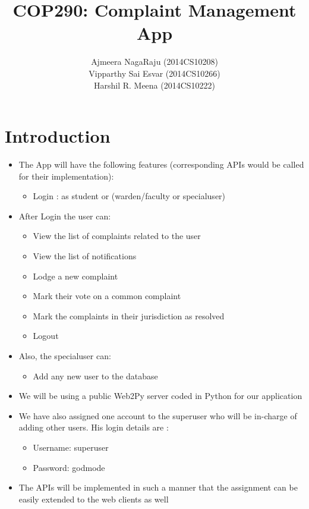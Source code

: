 \documentclass[12pt]{article}
\title{COP290: Complaint Management App}
\author{ Ajmeera NagaRaju (2014CS10208)\\Vipparthy Sai Esvar (2014CS10266) \\ Harshil R. Meena (2014CS10222) }
\begin{document}
\pagecolor{SpringGreen}
\maketitle



\section{Introduction}
\begin{itemize}
\item The App will have the following features (corresponding APIs would be called for their implementation):
	\begin{itemize}
		\color{blue}
		\item Login : as student or (warden/faculty or specialuser)
	\end{itemize}
\item After Login the user can:
	\begin{itemize}
		\color{blue}
		\item View the list of complaints related to the user
		\item View the list of notifications
		\item Lodge a new complaint
		\item Mark their vote on a common complaint
		\item Mark the complaints in their jurisdiction as resolved
		\item Logout
	\end{itemize}
\item Also, the specialuser can:
	\begin{itemize}
		\color{blue}
		\item Add any new user to the database
	\end{itemize}
\item We will be using a public Web2Py server coded in Python for our application
\item We have also assigned one account to the superuser who will be in-charge of adding other users. His login details are :
	\begin{itemize}
		\color{blue}
		\item Username: superuser
		\item Password: godmode
	\end{itemize}
\item The APIs will be implemented in such a manner that the assignment can be easily extended to the web clients as well
\end{itemize}
\end{document}
